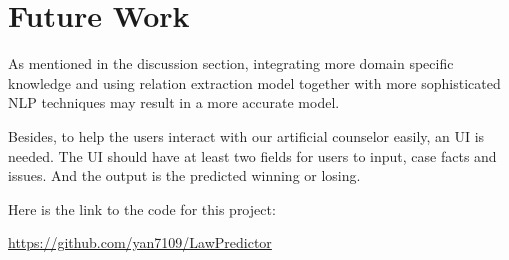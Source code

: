 \documentclass[journal]{IEEEtran}
\begin{document}
\section{Future Work}

As mentioned in the discussion section, integrating more domain specific knowledge and using relation extraction model together with more sophisticated NLP techniques may result in a more accurate model. 

Besides, to help the users interact with our artificial counselor easily, an UI is needed. The UI should have at least two fields for users to input, case facts and issues. And the output is the predicted winning or losing.

Here is the link to the code for this project:

\url{https://github.com/yan7109/LawPredictor}

\end{document}
